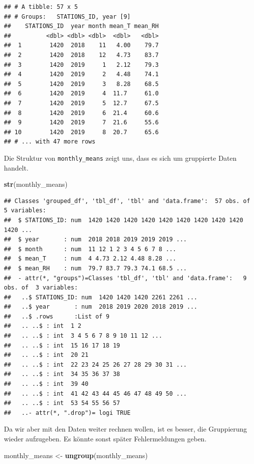 \documentclass[]{book}
\newenvironment{Shaded}{\begin{snugshade}}{\end{snugshade}}
\newcommand{\KeywordTok}[1]{\textcolor[rgb]{0.13,0.29,0.53}{\textbf{#1}}}
\newcommand{\NormalTok}[1]{#1}
\newcommand{\StringTok}[1]{\textcolor[rgb]{0.31,0.60,0.02}{#1}}
\begin{document}
\begin{verbatim}
## # A tibble: 57 x 5
## # Groups:   STATIONS_ID, year [9]
##    STATIONS_ID  year month mean_T mean_RH
##          <dbl> <dbl> <dbl>  <dbl>   <dbl>
##  1        1420  2018    11   4.00    79.7
##  2        1420  2018    12   4.73    83.7
##  3        1420  2019     1   2.12    79.3
##  4        1420  2019     2   4.48    74.1
##  5        1420  2019     3   8.28    68.5
##  6        1420  2019     4  11.7     61.0
##  7        1420  2019     5  12.7     67.5
##  8        1420  2019     6  21.4     60.6
##  9        1420  2019     7  21.6     55.6
## 10        1420  2019     8  20.7     65.6
## # ... with 47 more rows
\end{verbatim}

Die Struktur von \texttt{monthly\_means} zeigt uns, dass es sich um gruppierte Daten handelt.

\begin{Shaded}
\begin{Highlighting}[]
\KeywordTok{str}\NormalTok{(monthly_means)}
\end{Highlighting}
\end{Shaded}

\begin{verbatim}
## Classes 'grouped_df', 'tbl_df', 'tbl' and 'data.frame':  57 obs. of  5 variables:
##  $ STATIONS_ID: num  1420 1420 1420 1420 1420 1420 1420 1420 1420 1420 ...
##  $ year       : num  2018 2018 2019 2019 2019 ...
##  $ month      : num  11 12 1 2 3 4 5 6 7 8 ...
##  $ mean_T     : num  4 4.73 2.12 4.48 8.28 ...
##  $ mean_RH    : num  79.7 83.7 79.3 74.1 68.5 ...
##  - attr(*, "groups")=Classes 'tbl_df', 'tbl' and 'data.frame':   9 obs. of  3 variables:
##   ..$ STATIONS_ID: num  1420 1420 1420 2261 2261 ...
##   ..$ year       : num  2018 2019 2020 2018 2019 ...
##   ..$ .rows      :List of 9
##   .. ..$ : int  1 2
##   .. ..$ : int  3 4 5 6 7 8 9 10 11 12 ...
##   .. ..$ : int  15 16 17 18 19
##   .. ..$ : int  20 21
##   .. ..$ : int  22 23 24 25 26 27 28 29 30 31 ...
##   .. ..$ : int  34 35 36 37 38
##   .. ..$ : int  39 40
##   .. ..$ : int  41 42 43 44 45 46 47 48 49 50 ...
##   .. ..$ : int  53 54 55 56 57
##   ..- attr(*, ".drop")= logi TRUE
\end{verbatim}

Da wir aber mit den Daten weiter rechnen wollen, ist es besser, die Gruppierung wieder aufzugeben. Es könnte sonst später Fehlermeldungen geben.

\begin{Shaded}
\begin{Highlighting}[]
\NormalTok{monthly_means <-}\StringTok{ }\KeywordTok{ungroup}\NormalTok{(monthly_means)}
\end{Highlighting}
\end{Shaded}
\end{document}
